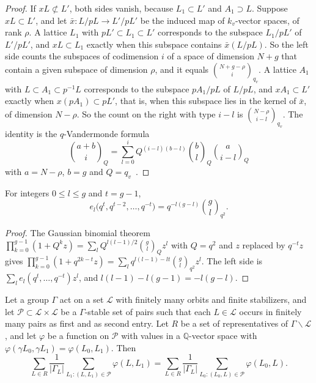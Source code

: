 \begin{proof}
If $xL\not\subset L'$, both sides vanish, because $L_1\subset L'$ and $A_1\supset L$. Suppose $xL\subset L'$, and let $\bar x\colon L/pL\to L'/pL'$ be the induced map of $k_v$-vector spaces, of rank $\rho$. A lattice $L_1$ with $pL'\subset L_1\subset L'$ corresponds to the subspace $L_1/pL'$ of $L'/pL'$, and $xL\subset L_1$ exactly when this subspace contains $\bar x(L/pL)$. So the left side counts the subspaces of codimension $i$ of a space of dimension $N+g$ that contain a given subspace of dimension $\rho$, and it equals $\binom{N+g-\rho}i_{q_v}$. A lattice $A_1$ with $L\subset A_1\subset p^{-1}L$ corresponds to the subspace $pA_1/pL$ of $L/pL$, and $xA_1\subset L'$ exactly when $x(pA_1)\subset pL'$, that is, when this subspace lies in the kernel of $\bar x$, of dimension $N-\rho$. So the count on the right with type $i-l$ is $\binom{N-\rho}{i-l}_{q_v}$. The identity is the $q$-Vandermonde formula
\[
\binom{a+b}i_{Q}=\sum_{l=0}^iQ^{(i-l)(b-l)}\binom bl_{Q}\binom a{i-l}_{Q}
\]
with $a=N-\rho$, $b=g$ and $Q=q_v$~\cite[(3.3.10)]{andrews}.
\end{proof}

\begin{lemma}\label{qbinom}
For integers $0\le l\le g$ and $t=g-1$,
\[
e_l\big(q^{t},q^{t-2},\dots,q^{-t}\big)=q^{-l(g-l)}\binom gl_{q^2}.
\]
\end{lemma}

\begin{proof}
The Gaussian binomial theorem $\prod_{k=0}^{g-1}(1+Q^kz)=\sum_lQ^{l(l-1)/2}\binom gl_Qz^l$ with $Q=q^2$ and $z$ replaced by $q^{-t}z$ gives $\prod_{k=0}^{g-1}(1+q^{2k-t}z)=\sum_lq^{l(l-1)-lt}\binom gl_{q^2}z^l$. The left side is $\sum_le_l(q^t,\dots,q^{-t})z^l$, and $l(l-1)-l(g-1)=-l(g-l)$.
\end{proof}

\begin{lemma}\label{edgecount}
Let a group $\Gamma$ act on a set $\mathcal L$ with finitely many orbits and finite stabilizers, and let $\mathcal P\subset\mathcal L\times\mathcal L$ be a $\Gamma$-stable set of pairs such that each $L\in\mathcal L$ occurs in finitely many pairs as first and as second entry. Let $R$ be a set of representatives of $\Gamma\backslash\mathcal L$, and let $\varphi$ be a function on $\mathcal P$ with values in a $\mathbb Q$-vector space with $\varphi(\gamma L_0,\gamma L_1)=\varphi(L_0,L_1)$. Then
\[
\sum_{L\in R}\frac1{\lvert\Gamma_L\rvert}\sum_{L_1:(L,L_1)\in\mathcal P}\varphi(L,L_1)=\sum_{L\in R}\frac1{\lvert\Gamma_L\rvert}\sum_{L_0:(L_0,L)\in\mathcal P}\varphi(L_0,L).
\]
\end{lemma}


